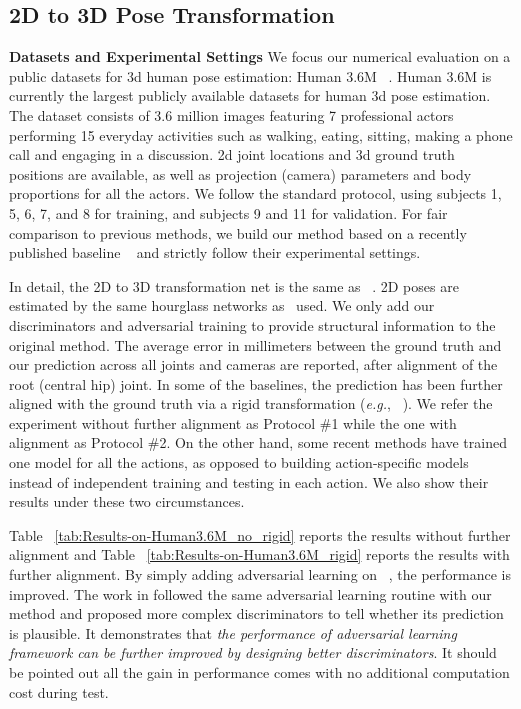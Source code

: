 \documentclass[10pt,journal,compsoc]{IEEEtran}
\begin{document}
\subsection{2D to 3D Pose Transformation}\label{subsec:3d pose}


\noindent \textbf{Datasets and Experimental Settings}
We focus our numerical evaluation on a public datasets for 3d human pose estimation: Human 3.6M ~\cite{ionescu2014human3}.
Human 3.6M is currently the largest publicly available datasets for human 3d pose estimation.
The dataset consists of 3.6 million images featuring 7 professional actors performing 15 everyday activities such as walking, eating, sitting, making a phone call and engaging in a discussion.
2d joint locations and 3d ground truth positions are available, as well as projection (camera) parameters and body proportions for all the actors.
We follow the standard protocol, using subjects 1, 5, 6, 7, and 8 for training, and subjects 9 and 11 for validation. For fair comparison to previous methods, we build our method based on a recently published baseline ~\cite{martinez2017simple} and strictly follow their experimental settings.

In detail, the 2D to 3D transformation net is the same as ~\cite{martinez2017simple}. 2D poses are estimated by the same  hourglass networks as ~\cite{martinez2017simple}used.
We only add our discriminators and adversarial training to provide structural information to the original method.
The average error in millimeters between the ground truth and our prediction across all joints and cameras are reported, after alignment of the root (central hip) joint.
In some of the baselines, the prediction has been further aligned with the ground truth via a rigid transformation (\emph{e.g.}, ~\cite{bogo2016keep,moreno20163d}).
We refer the experiment without further alignment as Protocol \#1 while the one with alignment as Protocol \#2. On the other hand, some recent methods have trained one model for all the actions, as opposed to building action-specific models instead of independent training and testing in each action.
We also show their results under these two circumstances.

Table ~\ref{tab:Results-on-Human3.6M_no_rigid} reports the results without further alignment and Table ~\ref{tab:Results-on-Human3.6M_rigid} reports the results with further alignment.
By simply adding adversarial learning on ~\cite{martinez2017simple}, the performance is improved.
The work in \cite{yang20183d} followed the same adversarial learning routine with our method and proposed more complex discriminators to tell whether its prediction is plausible. It demonstrates that \textit{the performance of adversarial learning framework can be further improved by designing better discriminators}.
It should be pointed out all the gain in performance comes with no additional computation cost during test.
\end{document}
